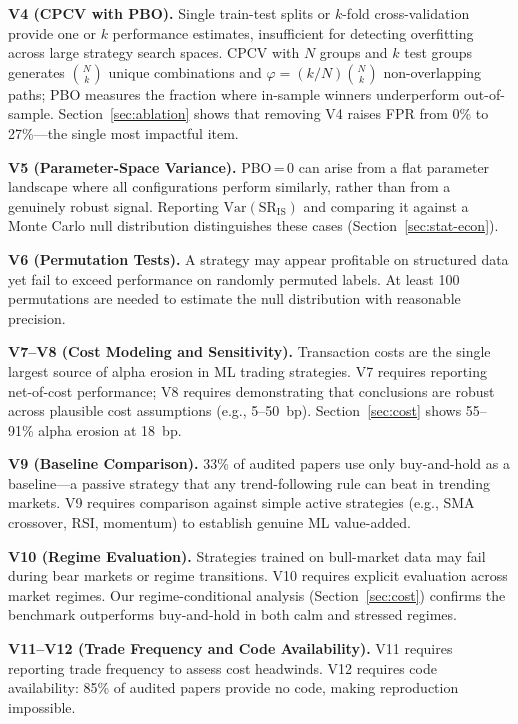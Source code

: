 \documentclass[sigconf,anonymous,review]{acmart}
\begin{document}
\textbf{V4 (CPCV with PBO).}
Single train-test splits or $k$-fold cross-validation provide one
or $k$ performance estimates, insufficient for detecting overfitting
across large strategy search spaces. CPCV with $N$ groups and $k$
test groups generates $\binom{N}{k}$ unique combinations and
$\varphi = (k/N)\binom{N}{k}$ non-overlapping paths; PBO measures
the fraction where in-sample winners underperform out-of-sample.
Section~\ref{sec:ablation} shows that removing V4 raises FPR from
0\% to 27\%---the single most impactful item.

\textbf{V5 (Parameter-Space Variance).}
PBO\,=\,0 can arise from a flat parameter landscape where all
configurations perform similarly, rather than from a genuinely
robust signal. Reporting $\mathrm{Var}(\mathrm{SR}_{\mathrm{IS}})$
and comparing it against a Monte Carlo null distribution
distinguishes these cases (Section~\ref{sec:stat-econ}).

\textbf{V6 (Permutation Tests).}
A strategy may appear profitable on structured data yet fail to
exceed performance on randomly permuted labels. At least 100
permutations are needed to estimate the null distribution with
reasonable precision.

\textbf{V7--V8 (Cost Modeling and Sensitivity).}
Transaction costs are the single largest source of alpha erosion in
ML trading strategies. V7 requires reporting net-of-cost performance;
V8 requires demonstrating that conclusions are robust across
plausible cost assumptions (e.g., 5--50~bp). Section~\ref{sec:cost}
shows 55--91\% alpha erosion at 18~bp.

\textbf{V9 (Baseline Comparison).}
33\% of audited papers use only buy-and-hold as a baseline---a
passive strategy that any trend-following rule can beat in trending
markets. V9 requires comparison against simple active strategies
(e.g., SMA crossover, RSI, momentum) to establish genuine ML
value-added.

\textbf{V10 (Regime Evaluation).}
Strategies trained on bull-market data may fail during bear markets
or regime transitions. V10 requires explicit evaluation across
market regimes. Our regime-conditional analysis
(Section~\ref{sec:cost}) confirms the benchmark outperforms
buy-and-hold in both calm and stressed regimes.

\textbf{V11--V12 (Trade Frequency and Code Availability).}
V11 requires reporting trade frequency to assess cost headwinds.
V12 requires code availability: 85\% of audited papers provide no
code, making reproduction impossible.
\end{document}
